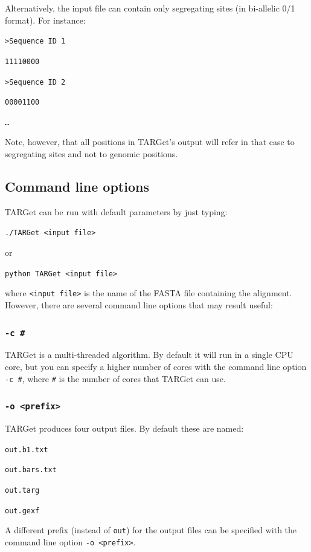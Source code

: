 \documentclass[12pt]{article}
\begin{document}
Alternatively, the input file can contain only segregating sites (in bi-allelic 0/1 format). For instance:

\texttt{>Sequence ID 1}

\texttt{11110000}

\texttt{>Sequence ID 2}

\texttt{00001100}

\texttt{\ldots}

\noindent Note, however, that all positions in TARGet's output will refer in that case to segregating sites and not to genomic positions.

\subsection*{Command line options}

TARGet can be run with default parameters by just typing:

\texttt{./TARGet <input file>}

\noindent or

\texttt{python TARGet <input file>}

\noindent where \texttt{<input file>} is the name of the FASTA file containing the alignment. However, there are several command line options that may result useful:

\subsubsection*{\texttt{-c \#}}

TARGet is a multi-threaded algorithm. By default it will run in a single CPU core, but you can specify a higher number of cores with the command line option \texttt{-c \#}, where \texttt{\#} is the number of cores that TARGet can use.

\subsubsection*{\texttt{-o <prefix>}}

TARGet produces four output files. By default these are named:

\texttt{out.b1.txt}

\texttt{out.bars.txt} 

\texttt{out.targ}

\texttt{out.gexf}

\noindent A different prefix (instead of \texttt{out}) for the output files can be specified with the command line option \texttt{-o <prefix>}.
\end{document}
